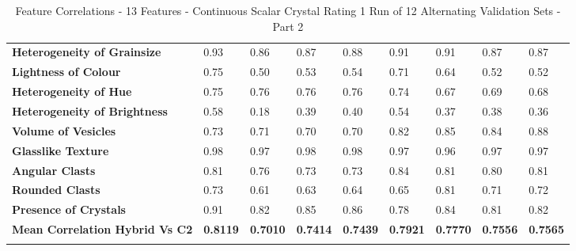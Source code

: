 \begin{longtable}[c]{@{}lllllllll@{}}
\textbf{Heterogeneity of Grainsize} &
  0.93 &
  0.86 &
  0.87 &
  0.88 &
  0.91 &
  0.91 &
  0.87 &
  0.87 \\
\textbf{Lightness of Colour} &
  0.75 &
  0.50 &
  0.53 &
  0.54 &
  0.71 &
  0.64 &
  0.52 &
  0.52 \\
\textbf{Heterogeneity of Hue} &
  0.75 &
  0.76 &
  0.76 &
  0.76 &
  0.74 &
  0.67 &
  0.69 &
  0.68 \\
\textbf{Heterogeneity of Brightness} &
  0.58 &
  0.18 &
  0.39 &
  0.40 &
  0.54 &
  0.37 &
  0.38 &
  0.36 \\
\textbf{Volume of Vesicles} &
  0.73 &
  0.71 &
  0.70 &
  0.70 &
  0.82 &
  0.85 &
  0.84 &
  0.88 \\
\textbf{Glasslike Texture} &
  0.98 &
  0.97 &
  0.98 &
  0.98 &
  0.97 &
  0.96 &
  0.97 &
  0.97 \\
\textbf{Angular Clasts} &
  0.81 &
  0.76 &
  0.73 &
  0.73 &
  0.84 &
  0.81 &
  0.80 &
  0.81 \\
\textbf{Rounded Clasts} &
  0.73 &
  0.61 &
  0.63 &
  0.64 &
  0.65 &
  0.81 &
  0.71 &
  0.72 \\
\textbf{Presence of Crystals} &
  0.91 &
  0.82 &
  0.85 &
  0.86 &
  0.78 &
  0.84 &
  0.81 &
  0.82 \\
\cellcolor[HTML]{FFFF00}\textbf{Mean   Correlation Hybrid Vs C2} &
  \cellcolor[HTML]{FFFF00}\textbf{0.8119} &
  \textbf{0.7010} &
  \textbf{0.7414} &
  \textbf{0.7439} &
  \textbf{0.7921} &
  \textbf{0.7770} &
  \textbf{0.7556} &
  \textbf{0.7565}
  \\
\caption{Feature Correlations - 13 Features - Continuous Scalar Crystal Rating 1 Run of 12 Alternating Validation Sets - Part 2}
\label{Feature Correlations - 13 Features - Continuous Scalar Crystal Rating 1 Run of 12 Alternating Validation Sets - Part 2}\\
\end{longtable}

